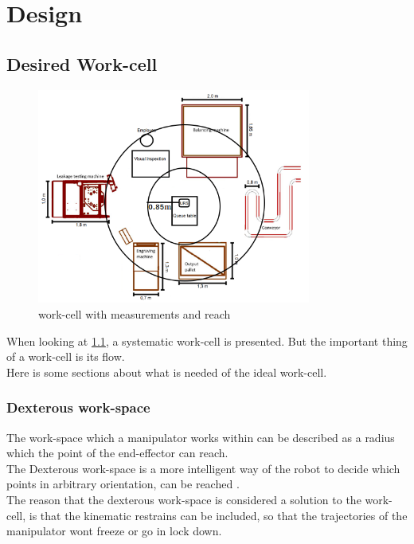 \chapter{Design}\label{Design}

\section{Desired Work-cell}

\begin{figure}[h]
    \centering
    \includegraphics[width=9cm]{Design/Work_cell_3.png}
    \caption{work-cell with measurements and reach}
    \label{fig:workcellMR}
\end{figure}

When looking at \ref{fig:workcellMR}, a systematic work-cell is presented. But the important thing of a work-cell is its flow.\\
Here is some sections about what is needed of the ideal work-cell.

\subsection{Dexterous work-space}

The work-space which a manipulator works within can be described as a radius which the point of the end-effector can reach.\\
The Dexterous work-space is a more intelligent way of the robot to decide which points in arbitrary orientation, can be reached \cite{Dexterous}.\\
The reason that the dexterous work-space is considered a solution to the work-cell, is that the kinematic restrains can be included, so that the trajectories of the manipulator wont freeze or go in lock down.\\


